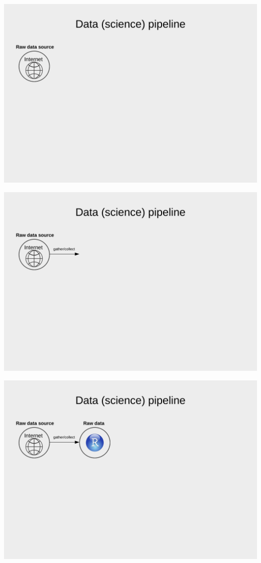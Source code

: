 \documentclass[
  ignorenonframetext,
]{beamer}
\begin{document}
\begin{frame}
\begin{center}\includegraphics[width=0.9\linewidth]{../../img/ds1} \end{center}
\end{frame}

\begin{frame}
\begin{center}\includegraphics[width=0.9\linewidth]{../../img/ds2} \end{center}
\end{frame}

\begin{frame}
\begin{center}\includegraphics[width=0.9\linewidth]{../../img/ds3} \end{center}
\end{frame}
\end{document}
